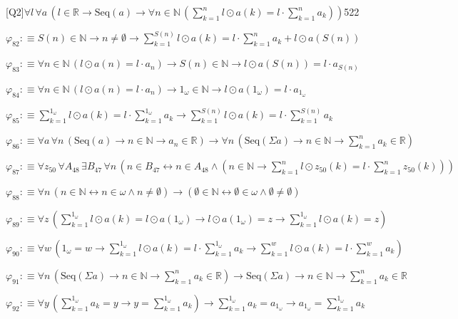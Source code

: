\begin{fullproof}{[Q2]}{$\forall l\,\forall a\,(l \in \mathbb{R} \to \mathrm{Seq}(a) \to \forall n \in \mathbb{N}\,({\textstyle\sum_{k=1}^{n} l \odot a(k)} = l \cdot {\textstyle\sum_{k=1}^{n} a_{k}}))$}{522}
\begin{abbrevlist}
\item $\varphi_{82} :\equiv S(n) \in \mathbb{N} \to n \neq \emptyset \to {\textstyle\sum_{k=1}^{S(n)} l \odot a(k)} = l \cdot {\textstyle\sum_{k=1}^{n} a_{k}} + l \odot a(S(n))$
\item $\varphi_{83} :\equiv \forall n \in \mathbb{N}\,(l \odot a(n) = l \cdot a_{n}) \to S(n) \in \mathbb{N} \to l \odot a(S(n)) = l \cdot a_{S(n)}$
\item $\varphi_{84} :\equiv \forall n \in \mathbb{N}\,(l \odot a(n) = l \cdot a_{n}) \to 1_{\omega} \in \mathbb{N} \to l \odot a(1_{\omega}) = l \cdot a_{1_{\omega}}$
\item $\varphi_{85} :\equiv {\textstyle\sum_{k=1}^{1_{\omega}} l \odot a(k)} = l \cdot {\textstyle\sum_{k=1}^{1_{\omega}} a_{k}} \to {\textstyle\sum_{k=1}^{S(n)} l \odot a(k)} = l \cdot {\textstyle\sum_{k=1}^{S(n)} a_{k}}$
\item $\varphi_{86} :\equiv \forall a\,\forall n\,(\mathrm{Seq}(a) \to n \in \mathbb{N} \to a_{n} \in \mathbb{R}) \to \forall n\,(\mathrm{Seq}(\Sigma a) \to n \in \mathbb{N} \to {\textstyle\sum_{k=1}^{n} a_{k}} \in \mathbb{R})$
\item $\varphi_{87} :\equiv \forall z_{50}\,\forall A_{48}\,\exists B_{47}\,\forall n\,(n \in B_{47} \leftrightarrow n \in A_{48} \land (n \in \mathbb{N} \to {\textstyle\sum_{k=1}^{n} l \odot z_{50}(k)} = l \cdot {\textstyle\sum_{k=1}^{n} z_{50}(k)}))$
\item $\varphi_{88} :\equiv \forall n\,(n \in \mathbb{N} \leftrightarrow n \in \omega \land n \neq \emptyset) \to (\emptyset \in \mathbb{N} \leftrightarrow \emptyset \in \omega \land \emptyset \neq \emptyset)$
\item $\varphi_{89} :\equiv \forall z\,({\textstyle\sum_{k=1}^{1_{\omega}} l \odot a(k)} = l \odot a(1_{\omega}) \to l \odot a(1_{\omega}) = z \to {\textstyle\sum_{k=1}^{1_{\omega}} l \odot a(k)} = z)$
\item $\varphi_{90} :\equiv \forall w\,(1_{\omega} = w \to {\textstyle\sum_{k=1}^{1_{\omega}} l \odot a(k)} = l \cdot {\textstyle\sum_{k=1}^{1_{\omega}} a_{k}} \to {\textstyle\sum_{k=1}^{w} l \odot a(k)} = l \cdot {\textstyle\sum_{k=1}^{w} a_{k}})$
\item $\varphi_{91} :\equiv \forall n\,(\mathrm{Seq}(\Sigma a) \to n \in \mathbb{N} \to {\textstyle\sum_{k=1}^{n} a_{k}} \in \mathbb{R}) \to \mathrm{Seq}(\Sigma a) \to n \in \mathbb{N} \to {\textstyle\sum_{k=1}^{n} a_{k}} \in \mathbb{R}$
\item $\varphi_{92} :\equiv \forall y\,({\textstyle\sum_{k=1}^{1_{\omega}} a_{k}} = y \to y = {\textstyle\sum_{k=1}^{1_{\omega}} a_{k}}) \to {\textstyle\sum_{k=1}^{1_{\omega}} a_{k}} = a_{1_{\omega}} \to a_{1_{\omega}} = {\textstyle\sum_{k=1}^{1_{\omega}} a_{k}}$

\end{abbrevlist}
\end{fullproof}
